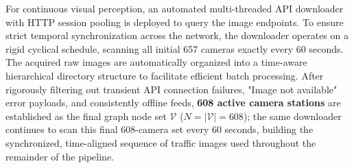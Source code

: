 \documentclass[a4paper,fleqn]{cas-sc}
\begin{document}
For continuous visual perception, an automated multi-threaded API downloader with HTTP session pooling is deployed to query the image endpoints. To ensure strict temporal synchronization across the network, the downloader operates on a rigid cyclical schedule, scanning all initial 657 cameras exactly every 60 seconds. The acquired raw images are automatically organized into a time-aware hierarchical directory structure to facilitate efficient batch processing. After rigorously filtering out transient API connection failures, "Image not available" error payloads, and consistently offline feeds, \textbf{608 active camera stations} are established as the final graph node set $\mathcal{V}$ ($N = |\mathcal{V}| = 608$); the same downloader continues to scan this final 608-camera set every 60 seconds, building the synchronized, time-aligned sequence of traffic images used throughout the remainder of the pipeline.

\end{document}

